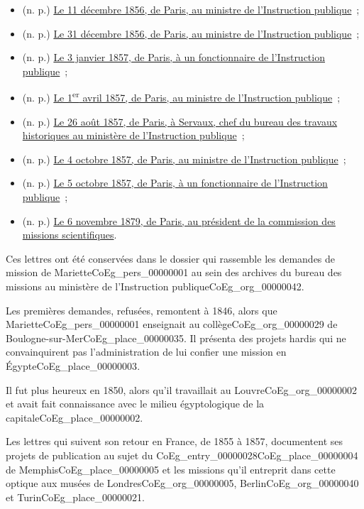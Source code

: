 \documentclass{book}
\begin{document}
\begin{itemize}
\item (n. p.) \hyperlink{CoEg_Mariette_1856-12-11}{Le 11 décembre 1856, de Paris, au ministre de l’Instruction publique}~;
\item (n. p.) \hyperlink{CoEg_Mariette_1856-12-31}{Le 31 décembre 1856, de Paris, au ministre de l’Instruction publique}~;
\item (n. p.) \hyperlink{CoEg_Mariette_1857-01-03}{Le 3 janvier 1857, de Paris, à un fonctionnaire de l’Instruction publique}~;
\item (n. p.) \hyperlink{CoEg_Mariette_1857-04-01}{Le 1\textsuperscript{er} avril 1857, de Paris, au ministre de l’Instruction publique}~;
\item (n. p.) \hyperlink{CoEg_Mariette_1857-08-26}{Le 26 août 1857, de Paris, à Servaux, chef du bureau des travaux historiques au ministère de l'Instruction publique}~;
\item (n. p.) \hyperlink{CoEg_Mariette_1857-10-04}{Le 4 octobre 1857, de Paris, au ministre de l’Instruction publique}~;
\item (n. p.) \hyperlink{CoEg_Mariette_1857-10-05}{Le 5 octobre 1857, de Paris, à un fonctionnaire de l’Instruction publique}~;
\item (n. p.) \hyperlink{CoEg_Mariette_1879-11-06}{Le 6 novembre 1879, de Paris, au président de la commission des missions scientifiques}.
\end{itemize}
\par Ces lettres ont été conservées dans le dossier qui rassemble les demandes de mission de Mariette\gls{CoEg_pers_00000001} au sein des archives du bureau des missions au ministère de l'Instruction publique\gls{CoEg_org_00000042}.
\par Les premières demandes, refusées, remontent à 1846, alors que Mariette\gls{CoEg_pers_00000001} enseignait au collège\gls{CoEg_org_00000029} de Boulogne-sur-Mer\gls{CoEg_place_00000035}. Il présenta des projets hardis qui ne convainquirent pas l'administration de lui confier une mission en Égypte\gls{CoEg_place_00000003}.
\par Il fut plus heureux en 1850, alors qu'il travaillait au Louvre\gls{CoEg_org_00000002} et avait fait connaissance avec le milieu égyptologique de la capitale\gls{CoEg_place_00000002}.
\par Les lettres qui suivent son retour en France, de 1855 à 1857, documentent ses projets de publication au sujet du \Gls{CoEg_entry_00000028}\gls{CoEg_place_00000004} de Memphis\gls{CoEg_place_00000005} et les missions qu'il entreprit dans cette optique aux musées de Londres\gls{CoEg_org_00000005}, Berlin\gls{CoEg_org_00000040} et Turin\gls{CoEg_place_00000021}.
\end{document}
